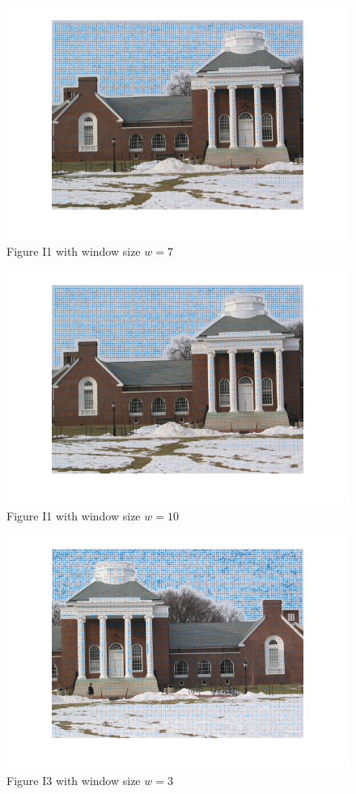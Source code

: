 \documentclass[letterpaper]{article}
\begin{document}
\begin{figure}[H]
\centering
\includegraphics[scale=0.7]{I1w7.png}
\caption{Figure I1 with window size $w = 7$}
\label{I1w7}
\end{figure}
\begin{figure}[H]
\centering
\includegraphics[scale=0.7]{I1w10.png}
\caption{Figure I1 with window size $w = 10$}
\label{I1w10}
\end{figure}
\begin{figure}[H]
\centering
\includegraphics[scale=0.7]{I3w3.png}
\caption{Figure I3 with window size $w = 3$}
\label{I3w3}
\end{figure}
\end{document}
